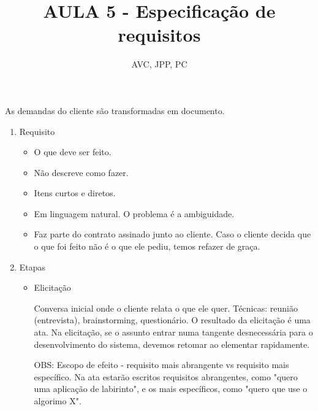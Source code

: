 \documentclass[
	12pt, %
]{fphw}
\title{AULA 5 - Especificação de requisitos} %
\author{AVC, JPP, PC} %
\date{} %
\institute{Pontifícia Universidade Católica do Rio de Janeiro \\ Departamento de Informática} %
\begin{document}
\maketitle %

\begin{doublespace}

As demandas do cliente são transformadas em documento.

\begin{enumerate}

    \item Requisito
    
    \begin{itemize}

        \item O que deve ser feito.
        \item Não descreve como fazer.
        \item Itens curtos e diretos.
        \item Em linguagem natural. O problema é a ambiguidade.
        \item Faz parte do contrato assinado junto ao cliente. Caso o cliente decida que o que foi feito não é o que ele pediu, temos refazer de graça.
        
    \end{itemize}

    \item Etapas
    
    \begin{itemize}

        \item Elicitação
        
        Conversa inicial onde o cliente relata o que ele quer. Técnicas: reunião (entrevista), brainstorming, questionário. O resultado da elicitação é uma ata. Na elicitação, se o assunto entrar numa tangente desnecessária para o desenvolvimento do sistema, devemos retomar ao elementar rapidamente.
        
        OBS: Escopo de efeito - requisito mais abrangente vs requisito mais específico. Na ata estarão escritos requisitos abrangentes, como "quero uma aplicação de labirinto", e os mais específicos, como "quero que use o algorimo X".


\end{itemize}
\end{enumerate}
\end{doublespace}
\end{document}
